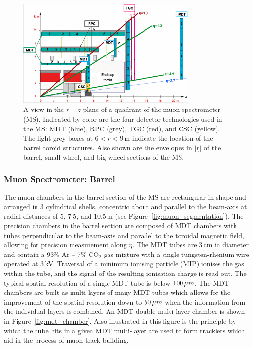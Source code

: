 \begin{figure}[!htb]
    \begin{center}
        \includegraphics[width=0.8\textwidth]{figures/chapter2/muon_spec/atlas_muon_plan_view_eta}
        \caption{
            A view in the $r-z$ plane of a quadrant of the muon spectrometer (MS).
            Indicated by color are the four detector technologies used in the MS:
            MDT (blue), RPC (grey), TGC (red), and CSC (yellow).
            The light grey boxes at $6 < r < 9$\,m indicate the location of the
            barrel toroid structures.
            Also shown are the envelopes in $\lvert \eta \rvert$ of the barrel,
            small wheel, and big wheel sections of the MS.
        }
        \label{fig:muon_plan_view_eta}
    \end{center}
\end{figure}
\FloatBarrier

\subsubsection{Muon Spectrometer: Barrel}
\label{sec:ms_barrel}

The muon chambers in the barrel section of the MS are rectangular in shape and arranged in 3 cylindrical shells,
concentric about and parallel to the beam-axis at radial distances of 5, 7.5, and 10.5\,m (see Figure~\ref{fig:muon_segmentation}).
The precision chambers in the barrel section are composed of MDT chambers
with tubes perpendicular to the beam-axis and parallel to the toroidal magnetic field,
allowing for precision measurement along $\eta$.
The MDT tubes are $3\,$cm in diameter and contain a 93\% Ar -- 7\% CO$_2$ gas mixture
with a single tungsten-rhenium wire operated at $3$\,kV.
Traversal of a minimum ionising particle (MIP) ionises the gas within the tube,
and the signal of the resulting ionisation charge is read out.
The typical spatial resolution of a single MDT tube is below $100\,\mu m$.
The MDT chambers are built as multi-layers of many MDT tubes which allows for the improvement
of the spatial resolution down to $50\,\mu m$ when the information from the individual layers is combined.
An MDT double multi-layer chamber is shown in Figure~\ref{fig:mdt_chamber}.
Also illustrated in this figure is the principle by which the tube hits in a given MDT
multi-layer are used to form tracklets which aid in the process of muon track-building.

